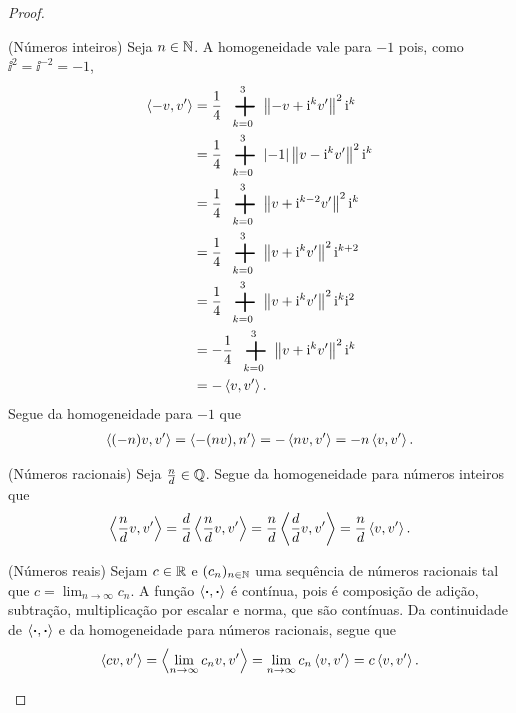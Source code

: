 \begin{proof}
\begin{enumerate}
\begin{enumerate}
	(Números inteiros) Seja $n \in \mathbb{N}$. A homogeneidade vale para $-1$ pois, como $\ii^2 = \ii^{-2} = -1$,
		\begin{align*}
		\inte{-v}{v'} &= \frac{1}{4} \sum_{k=0}^{3} \nor{-v+\ii^kv'}^2 \ii^k \\
			&= \frac{1}{4} \sum_{k=0}^{3} \abs{-1}\nor{v-\ii^kv'}^2 \ii^k \\
			&= \frac{1}{4} \sum_{k=0}^{3} \nor{v+\ii^{k-2}v'}^2 \ii^k \\
			&= \frac{1}{4} \sum_{k=0}^{3} \nor{v+\ii^kv'}^2 \ii^{k+2} \\
			&= \frac{1}{4} \sum_{k=0}^{3} \nor{v+\ii^kv'}^2 \ii^{k}\ii^2 \\
			&= -\frac{1}{4} \sum_{k=0}^{3} \nor{v+\ii^kv'}^2 \ii^{k} \\
			&= -\inte{v}{v'}.
		\end{align*}
	Segue da homogeneidade para $-1$ que
		\begin{align*}
		\left\langle{(-n)v},{v'}\right\rangle = \left\langle{-(nv)},{n'}\right\rangle = -\left\langle{nv},{v'}\right\rangle = -n\left\langle{v},{v'}\right\rangle.
		\end{align*}
	
	(Números racionais) Seja $\frac{n}{d} \in \mathbb{Q}$. Segue da homogeneidade para números inteiros que
		\begin{align*}
		\left\langle{\frac{n}{d}v},{v'}\right\rangle = \frac{d}{d}\left\langle{\frac{n}{d}v},{v'}\right\rangle = \frac{n}{d}\left\langle{\frac{d}{d}v},{v'}\right\rangle = \frac{n}{d}\left\langle{v},{v'}\right\rangle.
		\end{align*}

	(Números reais) Sejam $c \in \mathbb{R}$ e $(c_n)_{n \in \mathbb{N}}$ uma sequência de números racionais tal que $c = \lim_{n \to \infty} c_n$. A função $\left\langle{\bm{\cdot}},{\bm{\cdot}}\right\rangle$ é contínua, pois é composição de adição, subtração, multiplicação por escalar e norma, que são contínuas. Da continuidade de $\left\langle{\bm{\cdot}},{\bm{\cdot}}\right\rangle$ e da homogeneidade para números racionais, segue que
		\begin{equation*}
		\left\langle{cv},{v'}\right\rangle = \left\langle{\lim_{n \to \infty} c_n v},{v'}\right\rangle = \lim_{n \to \infty} c_n \left\langle{v},{v'}\right\rangle = c \left\langle{v},{v'}\right\rangle.
		\end{equation*}
	\end{enumerate}


\end{enumerate}
\end{proof}

